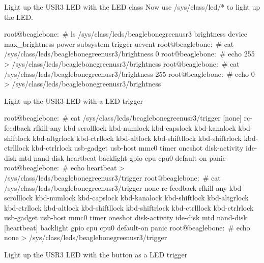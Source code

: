 \begin{Lab}
\begin{exe} {Light up the USR3 LED with the LED class}
   Now use /sys/class/led/* to light up the LED.

   \begin{sol}
      \begin{raw}
root@beaglebone:~# ls /sys/class/leds/beaglebone\:green\:usr3
brightness  device  max_brightness  power  subsystem  trigger  uevent
root@beaglebone:~# cat /sys/class/leds/beaglebone\:green\:usr3/brightness 
0
root@beaglebone:~# echo 255 > /sys/class/leds/beaglebone\:green\:usr3/brightness  
root@beaglebone:~# cat /sys/class/leds/beaglebone\:green\:usr3/brightness 
255
root@beaglebone:~# echo 0 > /sys/class/leds/beaglebone\:green\:usr3/brightness  
      \end{raw}
   \end{sol}
\end{exe}

\begin{exe} {Light up the USR3 LED with a LED trigger}

   \begin{sol}
      \begin{raw}
root@beaglebone:~# cat /sys/class/leds/beaglebone\:green\:usr3/trigger 
[none] rc-feedback rfkill-any kbd-scrolllock kbd-numlock kbd-capslock
kbd-kanalock kbd-shiftlock kbd-altgrlock kbd-ctrllock kbd-altlock
kbd-shiftllock kbd-shiftrlock kbd-ctrlllock kbd-ctrlrlock usb-gadget
usb-host mmc0 timer oneshot disk-activity ide-disk mtd nand-disk
heartbeat backlight gpio cpu cpu0 default-on panic 
root@beaglebone:~# echo heartbeat > /sys/class/leds/beaglebone\:green\:usr3/trigger
root@beaglebone:~# cat /sys/class/leds/beaglebone\:green\:usr3/trigger 
none rc-feedback rfkill-any kbd-scrolllock kbd-numlock kbd-capslock
kbd-kanalock kbd-shiftlock kbd-altgrlock kbd-ctrllock kbd-altlock
kbd-shiftllock kbd-shiftrlock kbd-ctrlllock kbd-ctrlrlock usb-gadget
usb-host mmc0 timer oneshot disk-activity ide-disk mtd nand-disk
[heartbeat] backlight gpio cpu cpu0 default-on panic 
root@beaglebone:~# echo none > /sys/class/leds/beaglebone\:green\:usr3/trigger
      \end{raw}
   \end{sol}
\end{exe}

\begin{exe} {Light up the USR3 LED with the button as a LED trigger}


\end{exe}
\end{Lab}
